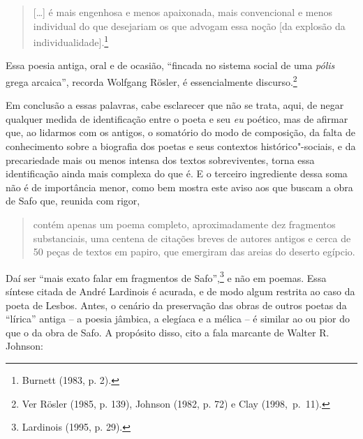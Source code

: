 \begin{quote}
[\ldots{}] é mais engenhosa e menos apaixonada,
mais convencional e menos individual do que desejariam os que advogam essa noção [da explosão da individualidade].\footnote{ Burnett (1983, p. 2).} 
\end{quote}

Essa poesia antiga, oral e de
ocasião, “fincada no sistema social de uma \textit{pólis} grega arcaica”,
recorda Wolfgang Rösler, é essencialmente discurso.\footnote{ Ver
Rösler (1985, p. 139), Johnson (1982, p. 72) e Clay \mbox{(1998, p. 11)}.}

Em conclusão a essas palavras, cabe esclarecer que não se trata, aqui, de negar
qualquer medida de identificação entre o poeta e seu \textit{eu} poético, mas de
afirmar que, ao lidarmos com os antigos, o somatório do modo de composição, da
falta de conhecimento sobre a biografia dos poetas e seus contextos
histórico"-sociais, e da precariedade mais ou menos intensa dos textos
sobreviventes, torna essa identificação ainda mais complexa do que é.
E o terceiro ingrediente dessa soma não é de importância menor, como
bem mostra este aviso aos que buscam a obra de Safo que, reunida com rigor,

\begin{quote}
contém apenas um poema completo, aproximadamente dez fragmentos substanciais,
uma centena de citações breves de autores antigos e cerca de 50 peças de textos
em papiro, que emergiram das areias do deserto egípcio.
\end{quote}

Daí ser “mais exato
falar em fragmentos de Safo”,\footnote{ Lardinois (1995, p. 29).} e não em
poemas. Essa síntese citada de André Lardinois é acurada, e de modo algum restrita ao
caso da poeta de Lesbos.
Antes, o cenário da preservação das obras de outros poetas da “lírica” antiga --
a poesia jâmbica, a elegíaca e a mélica -- é similar ao ou pior do que
o da obra de Safo. A propósito disso, cito a fala marcante de Walter R. Johnson:

